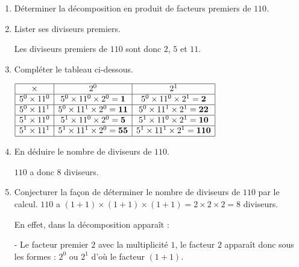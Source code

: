 \begin{corrige}
    \begin{enumerate}
        \item Déterminer la décomposition en produit de facteurs premiers de $110$.
        
        \item Lister ses diviseurs premiers.
        
        Les diviseurs premiers de $110$ sont donc $2$, $5$ et $11$.
        \item Compléter le tableau ci-dessous.
        
        \smallskip
        $\renewcommand{\arraystretch}{1}
        \begin{array}{|c|c|c|}
            \hline
            \times & 2^{0} & 2^{1}\\
            \hline
            5^{0}\times11^{0} & 5^{0}\times11^{0}\times2^{0}=\mathbf{1} & 5^{0}\times11^{0}\times2^{1}=\mathbf{2}\\
            \hline
            5^{0}\times11^{1} & 5^{0}\times11^{1}\times2^{0}=\mathbf{11} & 5^{0}\times11^{1}\times2^{1}=\mathbf{22}\\
            \hline
            5^{1}\times11^{0} & 5^{1}\times11^{0}\times2^{0}=\mathbf{5} & 5^{1}\times11^{0}\times2^{1}=\mathbf{10}\\
            \hline
            5^{1}\times11^{1} & 5^{1}\times11^{1}\times2^{0}=\mathbf{55} & 5^{1}\times11^{1}\times2^{1}=\mathbf{110}\\
            \hline
        \end{array}
        \renewcommand{\arraystretch}{1}$
        \smallskip

        \item En déduire le nombre de diviseurs de $110$.
        
        $110$ a donc $8$ diviseurs.

        \item Conjecturer la façon de déterminer le nombre de diviseurs de $110$ par le calcul.
        $110$ a $(1+1)\times(1+1)\times(1+1) = 2\times2\times2 = 8$ diviseurs.

        En effet, dans la décomposition apparaît :

        - Le facteur premier $2$ avec la multiplicité $1$, le facteur $2$ apparaît donc sous les formes : $2^{0}$ ou $2^{1}$ d'où le facteur $(1+1)$.


\end{enumerate}
\end{corrige}
